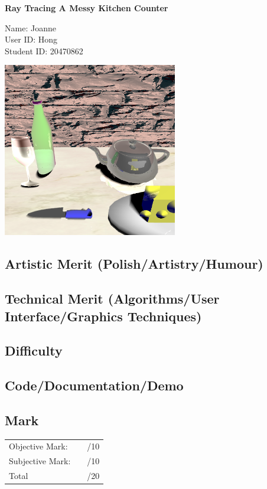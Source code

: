 \documentclass{article}
\newcommand\projecttitle{Ray Tracing A Messy Kitchen Counter}
\newcommand\myname{Joanne}
\newcommand\myuserid{Hong}
\newcommand\mystudentid{20470862}
\begin{document}
\begin{minipage}[t]{3in}
{\huge \bf 
	\projecttitle 
}

\medskip
Name: \myname \\ 
User ID: \myuserid \\ 
Student ID: \mystudentid 
\end{minipage}
\hfill
\begin{minipage}[t]{3in}
\vspace{0pt}
\includegraphics[width=3in]{screenshot.png}   %
\end{minipage}


\subsection*{Artistic Merit (Polish/Artistry/Humour)}
\vfill
\subsection*{Technical Merit (Algorithms/User Interface/Graphics Techniques)}
\vfill
\subsection*{Difficulty}
\vfill
\subsection*{Code/Documentation/Demo}
\vfill
\subsection*{Mark}
\begin{center}
\begin{tabular}{lr}
Objective Mark: &~~/10\\
Subjective Mark: &~~/10\\
\hline
Total &~~/20
\end{tabular}
\end{center}
\end{document}
